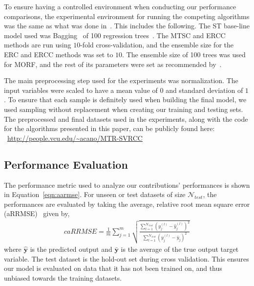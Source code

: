 \documentclass[preprint,12pt]{elsarticle}
\begin{document}
To ensure having a controlled environment when conducting our performance comparisons, the experimental environment for running the competing algorithms was the same as what was done in~\cite{Spyromitros2014}. This includes the following. The ST base-line model used was Bagging~\cite{Breiman1996} of 100 regression trees~\cite{Wu2015430}. The MTSC and ERCC methods are run using $10$-fold cross-validation, and the ensemble size for the ERC and ERCC methods was set to $10$. The ensemble size of 100 trees was used for MORF, and the rest of its parameters were set as recommended by~\cite{Kocev2013}.

The main preprocessing step used for the experiments was normalization. The input variables were scaled to have a mean value of $0$ and standard deviation of $1$. To ensure that each sample is definitely used when building the final model, we used sampling without replacement when creating our training and testing sets.
The preprocessed and final datasets used in the experiments, along with the code for the algorithms presented in this paper, can be publicly found here:\\ ~\url{http://people.vcu.edu/~acano/MTR-SVRCC}

\subsection{Performance Evaluation}\label{subsec:perfeval}
The performance metric used to analyze our contributions' performances is shown in Equation~\ref{eqn:aarmse}. For unseen or test datasets of size $\mathcal N_{test}$, the performances are evaluated by taking the average, relative root mean square error (aRRMSE)~\cite{Borchani2015,Friedman2010} given by,
\begin{eqnarray}{c}
\textit{aRRMSE} = \frac{1}{m} \sum_{j = 1}^m \sqrt{\frac{\sum_{l = 1}^{\mathcal N_{test}} (y_j^{(l)} - \hat{y}_j^{(l)})^2}{\sum_{l = 1}^{\mathcal N_{test}} (y_j^{(l)} - \bar{y}_j)^2}}
\label{eqn:aarmse}
\end{eqnarray}
where $\hat{\textbf{y}}$ is the predicted output and $\bar{\textbf{y}}$ is the average of the true output target variable. The test dataset is the hold-out set during cross validation. This ensures our model is evaluated on data that it has not been trained on, and thus unbiased towards the training datasets. 
\end{document}
